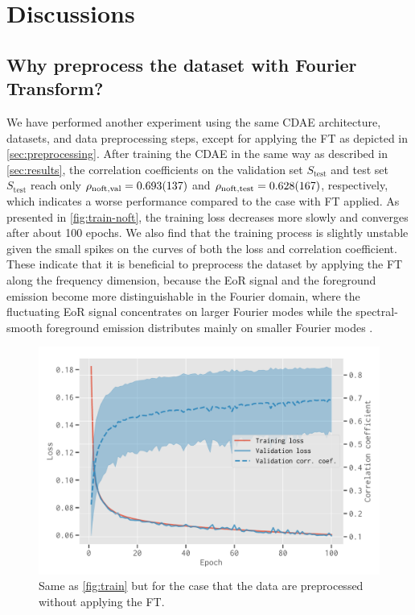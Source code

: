 \documentclass[fleqn,usenatbib]{mnras}
\newlength{\myfigwidth}
\newcommand{\R}[1]{\mathrm{#1}}
\newcommand{\editwip}[1]{{\leavevmode\color{magenta}#1}}
\begin{document}
\section{Discussions}
\label{sec:discussions}

\subsection{Why preprocess the dataset with Fourier Transform?}
\label{sec:why-ft}

We have performed another experiment using the same CDAE architecture,
datasets, and data preprocessing steps, except for applying the FT
as depicted in \autoref{sec:preprocessing}.
After training the CDAE in the same way as described in
\autoref{sec:results}, \editwip{the correlation coefficients on the
validation set $S_{\R{test}}$ and test set $S_{\R{test}}$ reach only
$\rho_{\R{noft,val}} = \num{0.693 +- 0.137}$ and
$\rho_{\R{noft,test}} = \num{0.628 +- 0.167}$, respectively,
which indicates a worse performance compared to the case with FT applied.
As presented in \autoref{fig:train-noft}, the training loss decreases more
slowly and converges after about 100 epochs.} %
We also find that the training process is slightly unstable given the small
spikes on the curves of both the loss and correlation coefficient.
These indicate that it is beneficial to preprocess the
dataset by applying the FT along the frequency dimension, because the
EoR signal and the foreground emission become more distinguishable
in the Fourier domain, where the fluctuating EoR signal concentrates on
larger Fourier modes while the spectral-smooth foreground emission
distributes mainly on smaller Fourier modes \citep[e.g.,][]{parsons2012}.

\begin{figure}
  \centering
  \includegraphics[width=\myfigwidth]{cdae-train-noft}
  \caption{\label{fig:train-noft}%
    Same as \autoref{fig:train} but for the case that the data are
    preprocessed without applying the FT.
  }
\end{figure}
\end{document}
